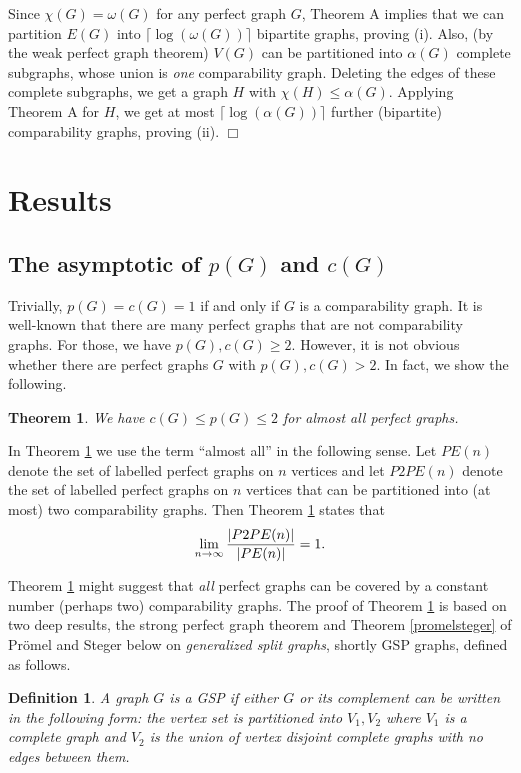 \documentclass[12pt]{article}
\newtheorem{theorem}{Theorem}%
\newtheorem{definition}{Definition}
\def\qed{\ifhmode\unskip\nobreak\fi\quad\ifmmode\Box\else$\Box$\fi}
\def\qed{\hfill $\Box$}
\begin{document}
Since  $\chi(G)=\omega(G)$
for any perfect graph $G$, Theorem A implies that we can partition $E(G)$ into
$\lceil\log(\omega(G))\rceil$ bipartite graphs, proving (i).
Also, (by the weak perfect graph theorem) $V(G)$ can be partitioned
into $\alpha(G)$ complete subgraphs, whose union is {\em one}
comparability graph. Deleting the edges of these complete subgraphs,
we get a graph $H$ with $\chi(H)\le \alpha(G)$. Applying Theorem A
for $H$, we get at most $\lceil\log(\alpha(G))\rceil$ further
(bipartite) comparability graphs, proving (ii). \qed




\section{Results}


\subsection{The asymptotic of $p(G)$ and $c(G)$}

Trivially, $p(G)=c(G)=1$  if and only if $G$ is a comparability graph.
It is well-known that there are many perfect graphs that are not comparability graphs.
For those, we have $p(G), c(G)\ge 2$. However, it is not obvious whether there are perfect graphs $G$ with $p(G), c(G)>2$.
In fact, we show the following.

\begin{theorem} \label{twocover} We have $c(G)\le p(G)\le 2$ for almost all perfect graphs.
\end{theorem}

In Theorem \ref{twocover} we use the term ``almost all'' in the following sense.
Let $PE(n)$ denote the set of labelled perfect graphs on $n$ vertices and let $P2PE(n)$ denote the
set of labelled perfect graphs on $n$ vertices that can be partitioned into (at most) two comparability graphs.
Then  Theorem \ref{twocover} states that
$$\lim_{n\rightarrow \infty} {|P2PE(n)|\over |PE(n)|}=1.$$

Theorem \ref{twocover} might suggest that {\em all} perfect graphs can be covered
by a constant number (perhaps two) comparability graphs. The proof of Theorem \ref{twocover}
is based on two deep results, the strong perfect graph theorem \cite{CRST} and Theorem \ref{promelsteger}
of Pr\"omel and Steger \cite{PS} below on {\em generalized split graphs}, shortly GSP graphs, defined as follows.

\begin{definition} A graph $G$ is a GSP if either $G$ or its complement can be written in the following form:
  the vertex set is partitioned into $V_1,V_2$ where $V_1$ is a complete graph and $V_2$ is the union of vertex disjoint complete graphs with no edges between them.
\end{definition}
\end{document}
